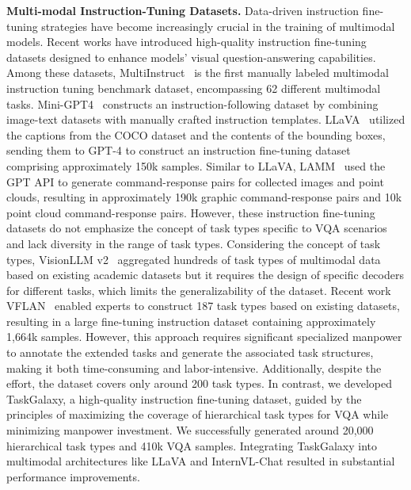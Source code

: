 \textbf{Multi-modal Instruction-Tuning Datasets.} 
Data-driven instruction fine-tuning strategies have become increasingly crucial in the training of multimodal models. Recent works have introduced high-quality instruction fine-tuning datasets designed to enhance models' visual question-answering capabilities. Among these datasets, MultiInstruct~\citep{multiinstruct} is the first manually labeled multimodal instruction tuning benchmark dataset, encompassing 62 different multimodal tasks. Mini-GPT4~\citep{minigpt} constructs an instruction-following dataset by combining image-text datasets with manually crafted instruction templates. LLaVA~\citep{llava} utilized the captions from the COCO dataset and the contents of the bounding boxes, sending them to GPT-4 to construct an instruction fine-tuning dataset comprising approximately 150k samples. Similar to LLaVA, LAMM~\citep{lamm} used the GPT API to generate command-response pairs for collected images and point clouds, resulting in approximately 190k graphic command-response pairs and 10k point cloud command-response pairs. However, these instruction fine-tuning datasets do not emphasize the concept of task types specific to VQA scenarios and lack diversity in the range of task types. Considering the concept of task types, VisionLLM v2~\citep{visionllmv2} aggregated hundreds of task types of multimodal data based on existing academic datasets but it requires the design of specific decoders for different tasks, which limits the generalizability of the dataset. Recent work VFLAN~\citep{vision_flan} enabled experts to construct 187 task types based on existing datasets, resulting in a large fine-tuning instruction dataset containing approximately 1,664k samples. However, this approach requires significant specialized manpower to annotate the extended tasks and generate the associated task structures, making it both time-consuming and labor-intensive. Additionally, despite the effort, the dataset covers only around 200 task types. In contrast, we developed TaskGalaxy, a high-quality instruction fine-tuning dataset, guided by the principles of maximizing the coverage of hierarchical task types for VQA while minimizing manpower investment. We successfully generated around 20,000 hierarchical task types and 410k VQA samples. Integrating TaskGalaxy into multimodal architectures like LLaVA and InternVL-Chat resulted in substantial performance improvements.

\vspace{-0.2cm}
